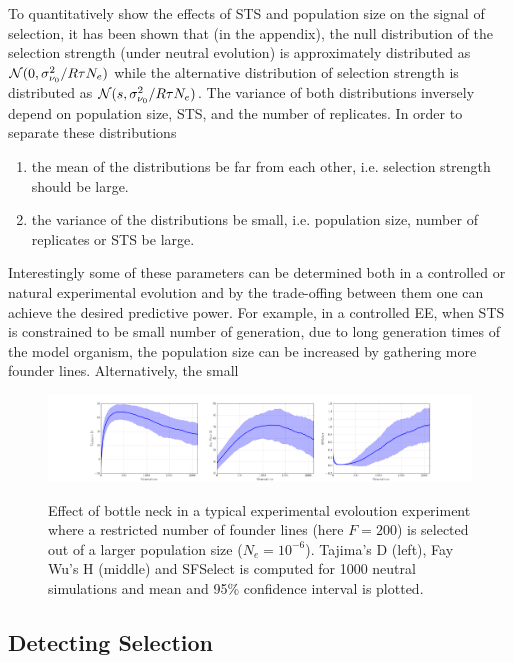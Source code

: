 \documentclass[11pt]{article}
\begin{document}
To quantitatively show the effects of STS and population size on the signal of 
selection, it has been shown that (in the appendix), the null distribution of 
the selection strength (under neutral evolution) is approximately distributed 
as ${\cal N}(0,\sigma^2_{\nu_0}/R\tau N_e)$ while the alternative distribution of 
selection strength is distributed as ${\cal N}(s,\sigma^2_{\nu_0}/R\tau N_e)$. The 
variance of both distributions inversely depend on population size, 
STS, and the number of replicates. In order to separate 
these distributions 
\begin{enumerate}
	\item the mean of the distributions be far from each other, i.e. selection 
	strength should be large.
	\item the variance of the distributions be small, i.e. population size, 
	number of replicates or STS be large.
\end{enumerate}
Interestingly some of these parameters can be determined both in a controlled 
or natural experimental evolution and by the trade-offing between them one can 
achieve the desired predictive power.
For example, in a controlled EE, when STS is constrained to be small number of 
generation, due to long generation times of the model organism, the population 
size can be increased by gathering more founder lines. Alternatively, the small 
\begin{figure}
	\centering \label{fig:bottleneck}
	\includegraphics[trim=3.2in 0.1in 3.2in 0.2in , 
	clip,width=\textwidth]{bottleneck}
		\caption{Effect of bottle neck in a typical experimental evoloution 
		experiment where a restricted number of founder lines (here $F=200$) is 
		selected out of a larger population size ($N_e=10^{-6}$). Tajima's D 
		(left), Fay Wu's H (middle) and SFSelect is computed for 1000 neutral 
		simulations and mean and 95\% confidence interval is plotted.} 
		\label{fig:bott}
\end{figure}



\subsection{Detecting Selection}
\end{document}
